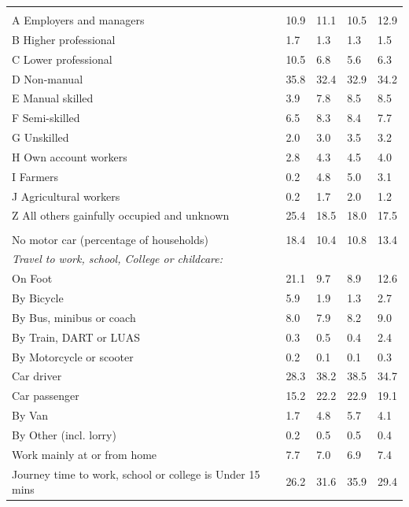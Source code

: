 \documentclass{article}
\begin{document}
\begin{table}[h]
\begin{tabular}{KTTTT}
\hline
    \\ 
    \hline
A Employers and managers & 10.9& 11.1& 10.5& 12.9\\
B Higher professional & 1.7& 1.3& 1.3& 1.5\\
C Lower professional & 10.5&  6.8&  5.6&  6.3\\
D Non-manual & 35.8& 32.4& 32.9& 34.2\\
E Manual skilled & 3.9& 7.8& 8.5& 8.5\\
F Semi-skilled & 6.5& 8.3& 8.4& 7.7\\
G Unskilled & 2.0& 3.0& 3.5& 3.2\\
H Own account workers & 2.8& 4.3& 4.5& 4.0\\
I Farmers & 0.2& 4.8& 5.0& 3.1\\
J Agricultural workers & 0.2& 1.7& 2.0& 1.2\\
Z All others gainfully occupied and unknown & 25.4& 18.5& 18.0& 17.5\\
\hline
{}\hline
    \\ 
    \hline
No motor car (percentage of households) & 18.4& 10.4& 10.8& 
13.4\\
    \hline 
\emph{Travel to work, school, College or childcare:} & & & \\
\quad On Foot & 21.1&  9.7&  8.9& 12.6\\ 
\quad By Bicycle & 5.9& 1.9& 1.3& 2.7\\ 
\quad By Bus, minibus or coach & 8.0& 7.9& 8.2& 9.0\\
\quad By Train, DART or LUAS & 0.3& 0.5& 0.4& 2.4\\
\quad By Motorcycle or scooter & 0.2& 0.1& 0.1& 0.3\\
\quad Car driver & 28.3 & 38.2& 38.5& 34.7\\
\quad Car passenger & 15.2& 22.2& 22.9& 19.1\\
\quad By Van & 1.7& 4.8& 5.7& 4.1\\
\quad By Other (incl. lorry) & 0.2& 0.5& 0.5& 0.4\\
    \hline
Work mainly at or from home & 7.7& 7.0& 6.9& 7.4\\
Journey time to work, school or college is Under 15 mins & 26.2& 31.6& 35.9& 29.4\\

\end{tabular}
\end{table}
\end{document}
